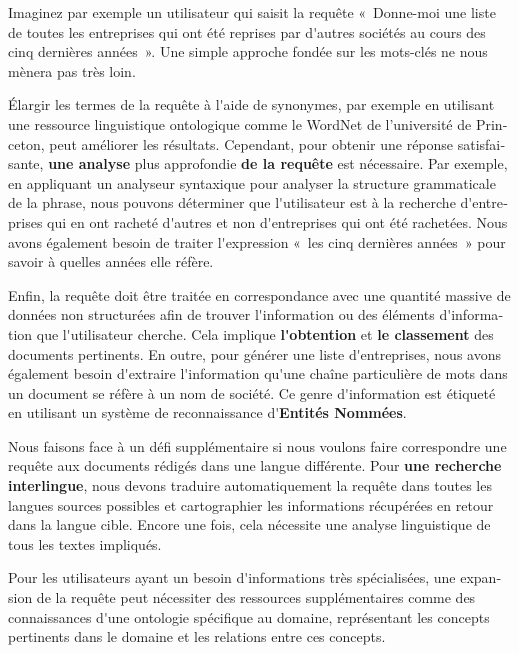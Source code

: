 \begin{french}
\begin{multicols}{2}
Imaginez par exemple un utilisateur qui saisit la requête «~Donne-moi
une liste de toutes les entreprises qui ont été reprises par d{\mbox '}autres
sociétés au cours des cinq dernières années~». Une simple approche
fondée sur les mots-clés ne nous mènera pas très loin.

Élargir les termes de la requête à l{\mbox '}aide de synonymes, par exemple en
utilisant une ressource linguistique ontologique comme le WordNet de
l'université de Princeton, peut améliorer les résultats. Cependant, pour obtenir une
réponse satisfaisante, {\bf une analyse} plus approfondie {\bf de la requête} est
nécessaire. Par exemple, en appliquant un analyseur syntaxique pour
analyser la structure grammaticale de la phrase, nous pouvons
déterminer que l{\mbox '}utilisateur est à la recherche d{\mbox '}entreprises qui en
ont racheté d{\mbox '}autres et non d{\mbox '}entreprises qui ont été rachetées. Nous
avons également besoin de traiter l{\mbox '}expression «~les cinq dernières
  années~» pour savoir à quelles années elle réfère.

Enfin, la requête doit être traitée en correspondance avec une
quantité massive de données non structurées afin de trouver
l{\mbox '}information ou des éléments d{\mbox '}information que l{\mbox '}utilisateur
cherche. Cela implique {\bf l{\mbox '}obtention} et {\bf le classement} des documents
pertinents. En outre, pour générer une liste d{\mbox '}entreprises, nous avons
également besoin d{\mbox '}extraire l{\mbox '}information qu{\mbox '}une chaîne particulière
de mots dans un document se réfère à un nom de société. Ce genre
d{\mbox '}information est étiqueté en utilisant un système de reconnaissance
d{\mbox '}{\bf Entités Nommées}.

Nous faisons face à un défi supplémentaire si nous voulons faire
correspondre une requête aux documents rédigés dans une langue
différente. Pour {\bf une recherche interlingue}, nous devons traduire
automatiquement la requête dans toutes les langues sources possibles
et cartographier les informations récupérées en retour dans la langue
cible. Encore une fois, cela nécessite une analyse linguistique de
tous les textes impliqués.

Pour les utilisateurs ayant un besoin d{\mbox '}informations très
spécialisées, une expansion de la requête peut nécessiter des
ressources supplémentaires comme des connaissances d{\mbox '}une ontologie
spécifique au domaine, représentant les concepts pertinents dans le
domaine et les relations entre ces concepts.


\end{multicols}
\end{french}
